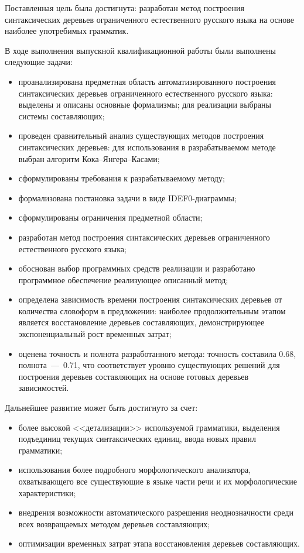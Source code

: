 
Поставленная цель была достигнута: разработан метод построения синтаксических деревьев ограниченного естественного русского языка на основе наиболее употребимых грамматик.

В ходе выполнения выпускной квалификационной работы были выполнены следующие задачи:
\begin{itemize}
	\item проанализирована предметная область автоматизированного построения синтаксических деревьев ограниченного естественного русского языка: выделены и описаны основные формализмы; для реализации выбраны системы составляющих;
	\item проведен сравнительный анализ существующих методов построения синтаксических деревьев: для использования в разрабатываемом методе выбран алгоритм Кока--Янгера--Касами;
	\item сформулированы требования к разрабатываемому методу;
	\item формализована постановка задачи в виде IDEF0-диаграммы;
	\item сформулированы ограничения предметной области;
	\item разработан метод построения синтаксических деревьев ограниченного естественного русского языка;
	\item обоснован выбор программных средств реализации и разработано программное обеспечение реализующее описанный метод;
	\item определена зависимость времени построения синтаксических деревьев от количества словоформ в предложении: наиболее продолжительным этапом является восстановление деревьев составляющих, демонстрирующее экспоненциальный рост временных затрат;
	\item оценена точность и полнота разработанного метода: точность составила 0.68, полнота~---~0.71, что соответствует уровню существующих решений для построения деревьев составляющих на основе готовых деревьев зависимостей.
\end{itemize}

Дальнейшее развитие может быть достигнуто за счет:
\begin{itemize}
	\item более высокой <<детализации>> используемой грамматики, выделения подъединиц текущих синтаксических единиц, ввода новых правил грамматики;
	\item использования более подробного морфологического анализатора, охватывающего все существующие в языке части речи и их морфологические характеристики;
	\item внедрения возможности автоматического разрешения неоднозначности среди всех возвращаемых методом деревьев составляющих;
	\item оптимизации временных затрат этапа восстановления деревьев составляющих.
\end{itemize}



\clearpage